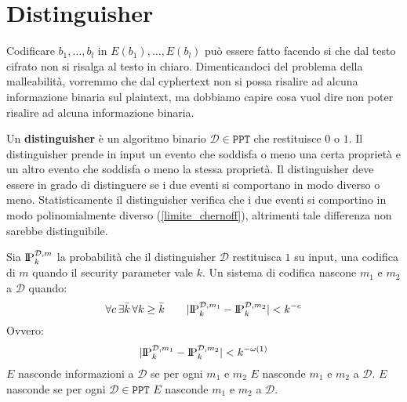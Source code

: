 \section{Distinguisher}\label{sec:distinguisher}
Codificare $b_1, \dots, b_l$ in $E(b_1), \dots, E(b_l)$ può essere fatto facendo si che dal testo cifrato non si risalga 
al testo in chiaro. Dimenticandoci del problema della malleabilità, vorremmo che dal cyphertext non si possa risalire
ad alcuna informazione binaria sul plaintext, ma dobbiamo capire cosa vuol dire non poter risalire ad alcuna informazione
binaria.
\begin{tcolorbox}[title = Distinguisher]
  Un \textbf{distinguisher} è un algoritmo binario $\mathcal{D} \in \texttt{PPT}$ che restituisce $0$ o $1$. Il distinguisher
  prende in input un evento che soddisfa o meno una certa proprietà e 
  un altro evento che soddisfa o meno la stessa proprietà. Il distinguisher deve essere in grado di distinguere
  se i due eventi si comportano in modo diverso o meno.
  Statisticamente il distinguisher verifica che i due eventi si comportino in modo polinomialmente diverso
  (\ref{limite_chernoff}), altrimenti tale differenza non sarebbe distinguibile.
\end{tcolorbox}
Sia $\text{I\kern-0.15em P}_k^{\mathcal{D}, m}$ la probabilità che il distinguisher $\mathcal{D}$ restituisca $1$ su input, una codifica 
di $m$ quando il security parameter vale $k$. Un sistema di codifica nascone $m_1$ e $m_2$ a $\mathcal{D}$ quando:
\begin{equation}
  \forall c \, \exists \bar{k} \, \forall k \geq \bar{k} \qquad
  |\text{I\kern-0.15em P}_k^{\mathcal{D}, m_1} - \text{I\kern-0.15em P}_k^{\mathcal{D}, m_2}| < k^{-c}
\end{equation}
Ovvero:
\begin{equation}
  |\text{I\kern-0.15em P}_k^{\mathcal{D}, m_1} - \text{I\kern-0.15em P}_k^{\mathcal{D}, m_2}| < k^{-\omega(1)}
\end{equation}
$E$ nasconde informazioni a $\mathcal{D}$ se per ogni $m_1$ e $m_2$ $E$ nasconde $m_1$ e $m_2$ a $\mathcal{D}$. 
$E$ nasconde se per ogni $\mathcal{D} \in \texttt{PPT}$ $E$ nasconde $m_1$ e $m_2$ a $\mathcal{D}$.
